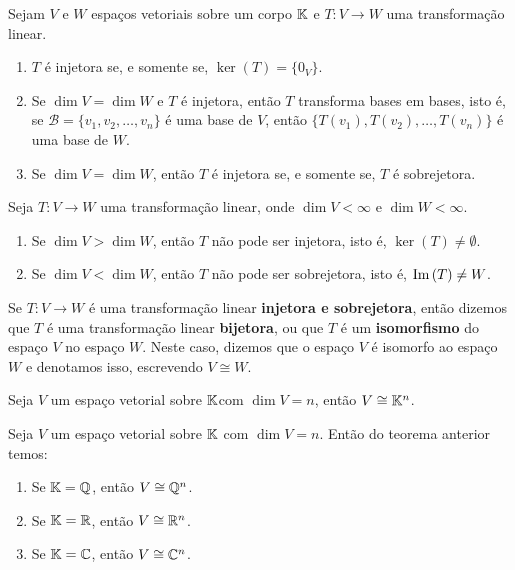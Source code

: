 \begin{proposicao}\label{caracteriza_transformacao_injetora}
    Sejam $V$ e $W$ espaços vetoriais sobre um corpo $\mathbb{K}$ e $T \colon V \to W$ uma transformação linear.
    \begin{enumerate}[label={\roman*})]
        \item $T$ é injetora se, e somente se, $\ker(T) = \{0_V\}$.

        \item Se $\dim V = \dim W$ e $T$ é injetora, então $T$ transforma bases em bases, isto é, se $\mathcal{B} = \{v_1, v_2, \dots, v_n\}$ é uma base de $V$, então $\{T(v_1), T(v_2), \dots, T(v_n)\}$ é uma base de $W$.

        \item Se $\dim V = \dim W$, então $T$ é injetora se, e somente se, $T$ é sobrejetora.
    \end{enumerate}
\end{proposicao}

\begin{observacoes}
    Seja $T \colon V \to W$ uma transformação linear, onde $\dim V < \infty$ e $\dim W < \infty$.
    \begin{enumerate}[label={\roman*})]
        \item Se $\dim V > \dim W$, então $T$ não pode ser injetora, isto é, $\ker(T) \ne \emptyset$.

        \item Se $\dim V < \dim W$, então $T$ não pode ser sobrejetora, isto é, ${\rm Im\,}(T) \ne W$.
    \end{enumerate}
\end{observacoes}

\begin{definicao}
    Se $T \colon V \to W$ é uma transformação linear \textbf{injetora e sobrejetora}, então dizemos que $T$ é uma transformação linear \textbf{bijetora}, ou que $T$ é um \textbf{isomorfismo} do espaço $V$ no espaço $W$. Neste caso, dizemos que o espaço $V$ é isomorfo ao espaço $W$ e denotamos isso, escrevendo $V \cong W$.
\end{definicao}

\begin{teorema}
    Seja $V$ um espaço vetorial sobre $\mathbb{K}$com $\dim V = n$, então $V \cong \mathbb{K}^n$.
\end{teorema}

\begin{observacoes}
    Seja $V$ um espaço vetorial sobre $\mathbb{K}$ com $\dim V = n$. Então do teorema anterior temos:
    \begin{enumerate}[label={\roman*})]
        \item Se $\mathbb{K} = \mathbb{Q}$, então $V \cong \mathbb{Q}^n$.

        \item Se $\mathbb{K} = \mathbb{R}$, então $V \cong \mathbb{R}^n$.

        \item Se $\mathbb{K} = \mathbb{C}$, então $V \cong \mathbb{C}^n$.
    \end{enumerate}
\end{observacoes}

